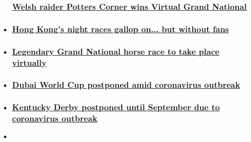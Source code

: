 \begin{itemize}
{  \subsubsection{\texorpdfstring{\href{/2020/04/04/sport/potters-corner-wins-virtual-grand-national-aintree/index.html}{Welsh
  raider Potters Corner wins Virtual Grand National
  }}{Welsh raider Potters Corner wins Virtual Grand National }}\label{welsh-raider-potters-corner-wins-virtual-grand-national-}}
\item
  \hypertarget{hong-kongs-night-races-gallop-on-but-without-fans}{%
  \subsubsection{\texorpdfstring{\href{/2020/03/31/sport/hong-kong-horse-racing-coronavirus-happy-valley-spt-intl/index.html}{Hong
  Kong's night races gallop on... but without
  fans}}{Hong Kong's night races gallop on... but without fans}}\label{hong-kongs-night-races-gallop-on-but-without-fans}}
\item
  \hypertarget{legendary-grand-national-horse-race-to-take-place-virtually}{%
  \subsubsection{\texorpdfstring{\href{/2020/04/03/sport/virtual-grand-national-horse-racing-coronavirus-spt-intl/index.html}{Legendary
  Grand National horse race to take place
  virtually}}{Legendary Grand National horse race to take place virtually}}\label{legendary-grand-national-horse-race-to-take-place-virtually}}
\item
  \hypertarget{dubai-world-cup-postponed-amid-coronavirus-outbreak}{%
  \subsubsection{\texorpdfstring{\href{/2020/03/22/sport/dubai-world-cup-coronavirus-spt-intl/index.html}{Dubai
  World Cup postponed amid coronavirus
  outbreak}}{Dubai World Cup postponed amid coronavirus outbreak}}\label{dubai-world-cup-postponed-amid-coronavirus-outbreak}}
\item
  \hypertarget{kentucky-derby-postponed-until-september-due-to-coronavirus-outbreak}{%
  \subsubsection{\texorpdfstring{\href{/2020/03/17/sport/kentucky-derby-postponed-september-coronavirus-spt-intl/index.html}{Kentucky
  Derby postponed until September due to coronavirus
  outbreak}}{Kentucky Derby postponed until September due to coronavirus outbreak}}\label{kentucky-derby-postponed-until-september-due-to-coronavirus-outbreak}}
\item
  \hypertarget{dubai-world-cup-to-go-ahead----without-fans}{%
}
\end{itemize}
